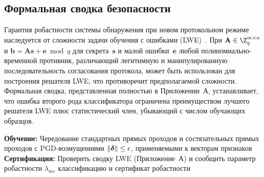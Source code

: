 \subsection{Формальная сводка безопасности}

Гарантия робастности системы обнаружения при новом протокольном режиме наследуется от сложности задачи обучения с ошибками (LWE)~\cite{Regev2009,Peikert2016}. При $\mathbf{A}\in\Z_q^{m\times n}$ и $\mathbf{b}=\mathbf{A}\mathbf{s}+\mathbf{e}\bmod q$ для секрета~$\mathbf{s}$ и малой ошибки~$\mathbf{e}$ любой полиномиально-временной противник, различающий легитимную и манипулированную последовательность согласования протокола, может быть использован для построения решателя LWE, что противоречит предполагаемой сложности. Формальная сводка, представленная полностью в Приложении~А, устанавливает, что ошибка второго рода классификатора ограничена преимуществом лучшего решателя LWE плюс статистический член, убывающий с числом обучающих образцов.

\begin{algorithm}[htbp]
\caption{Прямо совместимое мультипротокольное обнаружение}\label{alg:pqidps}
\textbf{Обучение:} Чередование стандартных прямых проходов и состязательных прямых проходов с PGD-возмущениями $\|\boldsymbol{\delta}\|\le\epsilon$, применяемыми к векторам признаков\;
\textbf{Сертификация:} Проверить сводку LWE (Приложение~А) и сообщить параметр робастности $\lambda_{\mathrm{sec}}$\;
\Return классификацию и сертификат робастности
\end{algorithm}


